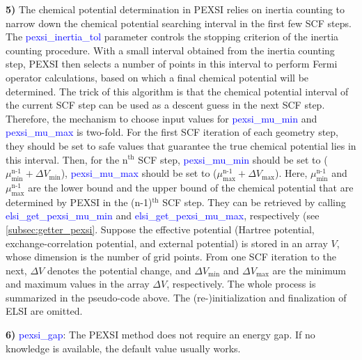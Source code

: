 \documentclass{report}
\begin{document}
\textbf{5)} The chemical potential determination in PEXSI relies on inertia counting to narrow down the chemical potential searching interval in the first few SCF steps.  The \textcolor{blue}{pexsi\_inertia\_tol} parameter controls the stopping criterion of the inertia counting procedure.  With a small interval obtained from the inertia counting step, PEXSI then selects a number of points in this interval to perform Fermi operator calculations, based on which a final chemical potential will be determined.  The trick of this algorithm is that the chemical potential interval of the current SCF step can be used as a descent guess in the next SCF step.  Therefore, the mechanism to choose input values for \textcolor{blue}{pexsi\_mu\_min} and \textcolor{blue}{pexsi\_mu\_max} is two-fold.  For the first SCF iteration of each geometry step, they should be set to safe values that guarantee the true chemical potential lies in this interval.  Then, for the n$^\text{th}$ SCF step, \textcolor{blue}{pexsi\_mu\_min} should be set to ($\mu_\text{min}^\text{n-1} + \Delta V_\text{min}$), \textcolor{blue}{pexsi\_mu\_max} should be set to ($\mu_\text{max}^\text{n-1} + \Delta V_\text{max}$).  Here, $\mu_\text{min}^\text{n-1}$ and $\mu_\text{max}^\text{n-1}$ are the lower bound and the upper bound of the chemical potential that are determined by PEXSI in the (n-1)$^\text{th}$ SCF step.  They can be retrieved by calling \textcolor{blue}{elsi\_get\_pexsi\_mu\_min} and \textcolor{blue}{elsi\_get\_pexsi\_mu\_max}, respectively (see \ref{subsec:getter_pexsi}.  Suppose the effective potential (Hartree potential, exchange-correlation potential, and external potential) is stored in an array $V$, whose dimension is the number of grid points.  From one SCF iteration to the next, $\Delta V$ denotes the potential change, and $\Delta V_\text{min}$ and $\Delta V_\text{max}$ are the minimum and maximum values in the array $\Delta V$, respectively.  The whole process is summarized in the pseudo-code above.  The (re-)initialization and finalization of ELSI are omitted.

\textbf{6)} \textcolor{blue}{pexsi\_gap}:  The PEXSI method does not require an energy gap.  If no knowledge is available, the default value usually works.
\end{document}
